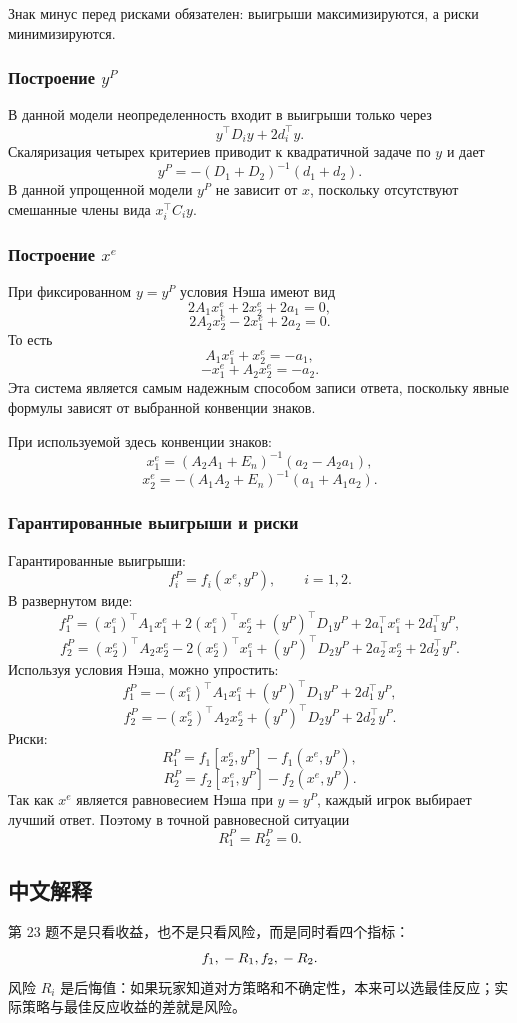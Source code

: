 \documentclass[12pt,a4paper]{article}
\begin{document}
Знак минус перед рисками обязателен: выигрыши максимизируются, а риски минимизируются.

\subsubsection{Построение $y^P$}
В данной модели неопределенность входит в выигрыши только через
\[
y^\top D_i y+2d_i^\top y.
\]
Скаляризация четырех критериев приводит к квадратичной задаче по $y$ и дает
\[
y^P=-(D_1+D_2)^{-1}(d_1+d_2).
\]
В данной упрощенной модели $y^P$ не зависит от $x$, поскольку отсутствуют смешанные члены вида $x_i^\top C_i y$.

\subsubsection{Построение $x^e$}
При фиксированном $y=y^P$ условия Нэша имеют вид
\[
2A_1x_1^e+2x_2^e+2a_1=0,
\]
\[
2A_2x_2^e-2x_1^e+2a_2=0.
\]
То есть
\[
A_1x_1^e+x_2^e=-a_1,
\]
\[
-x_1^e+A_2x_2^e=-a_2.
\]
Эта система является самым надежным способом записи ответа, поскольку явные формулы зависят от выбранной конвенции знаков.

При используемой здесь конвенции знаков:
\[
x_1^e=(A_2A_1+E_n)^{-1}(a_2-A_2a_1),
\]
\[
x_2^e=-(A_1A_2+E_n)^{-1}(a_1+A_1a_2).
\]

\subsubsection{Гарантированные выигрыши и риски}
Гарантированные выигрыши:
\[
f_i^P=f_i(x^e,y^P),
\qquad i=1,2.
\]
В развернутом виде:
\[
f_1^P=(x_1^e)^\top A_1x_1^e+2(x_1^e)^\top x_2^e+(y^P)^\top D_1y^P+2a_1^\top x_1^e+2d_1^\top y^P,
\]
\[
f_2^P=(x_2^e)^\top A_2x_2^e-2(x_2^e)^\top x_1^e+(y^P)^\top D_2y^P+2a_2^\top x_2^e+2d_2^\top y^P.
\]
Используя условия Нэша, можно упростить:
\[
f_1^P=-(x_1^e)^\top A_1x_1^e+(y^P)^\top D_1y^P+2d_1^\top y^P,
\]
\[
f_2^P=-(x_2^e)^\top A_2x_2^e+(y^P)^\top D_2y^P+2d_2^\top y^P.
\]
Риски:
\[
R_1^P=f_1[x_2^e,y^P]-f_1(x^e,y^P),
\]
\[
R_2^P=f_2[x_1^e,y^P]-f_2(x^e,y^P).
\]
Так как $x^e$ является равновесием Нэша при $y=y^P$, каждый игрок выбирает лучший ответ. Поэтому в точной равновесной ситуации
\[
R_1^P=R_2^P=0.
\]

\subsection{中文解释}
第 23 题不是只看收益，也不是只看风险，而是同时看四个指标：
\[
f_1,\\ -R_1,\\ f_2,\\ -R_2.
\]
风险 $R_i$ 是后悔值：如果玩家知道对方策略和不确定性，本来可以选最佳反应；实际策略与最佳反应收益的差就是风险。
\end{document}
